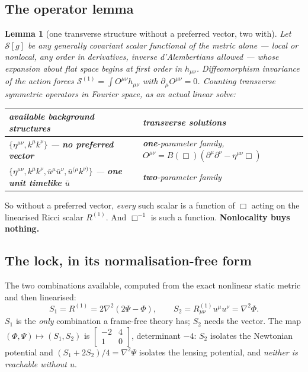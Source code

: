 \documentclass[11pt,letterpaper]{article}
\newtheorem{lemma}{Lemma}
\newcommand{\dal}{\Box}
\begin{document}
\subsection{The operator lemma}
\begin{lemma}[one transverse structure without a preferred vector, two with]\label{lem:ops}
Let $\mathcal{S}[g]$ be any generally covariant scalar functional of the metric alone --- local or nonlocal, any order in derivatives, inverse d'Alembertians allowed --- whose expansion about flat space begins at first order in $h_{\mu\nu}$. Diffeomorphism invariance of the action forces $\mathcal{S}^{(1)}=\int O^{\mu\nu}h_{\mu\nu}$ with $\partial_\mu O^{\mu\nu}=0$. Counting transverse symmetric operators in Fourier space, as an actual linear solve:
\begin{center}\small
\begin{tabular}{L{0.52\textwidth}L{0.40\textwidth}}\toprule
available background structures & transverse solutions\\\midrule
$\{\eta^{\mu\nu},k^\mu k^\nu\}$ --- \textbf{no preferred vector} & \textbf{one}-parameter family, $O^{\mu\nu}=B(\dal)(\partial^\mu\partial^\nu-\eta^{\mu\nu}\dal)$\\
$\{\eta^{\mu\nu},k^\mu k^\nu,\bar u^\mu\bar u^\nu,\bar u^{(\mu}k^{\nu)}\}$ --- \textbf{one unit timelike $\bar u$} & \textbf{two}-parameter family\\\bottomrule
\end{tabular}
\end{center}
\end{lemma}
So without a preferred vector, \emph{every} such scalar is a function of $\dal$ acting on the linearised Ricci scalar $R^{(1)}$. And $\dal^{-1}$ is such a function. \textbf{Nonlocality buys nothing.}

\subsection{The lock, in its normalisation-free form}
The two combinations available, computed from the exact nonlinear static metric and then linearised:
\begin{equation}
S_1=R^{(1)}=2\nabla^2(2\Psi-\Phi),\qquad
S_2=R^{(1)}_{\mu\nu}u^\mu u^\nu=\nabla^2\Phi .
\end{equation}
$S_1$ is the \emph{only} combination a frame-free theory has; $S_2$ needs the vector. The map $(\Phi,\Psi)\mapsto(S_1,S_2)$ is $\left[\begin{smallmatrix}-2&4\\1&0\end{smallmatrix}\right]$, determinant $-4$: $S_2$ isolates the Newtonian potential and $(S_1+2S_2)/4=\nabla^2\Psi$ isolates the lensing potential, and \emph{neither is reachable without $u$}.
\end{document}
